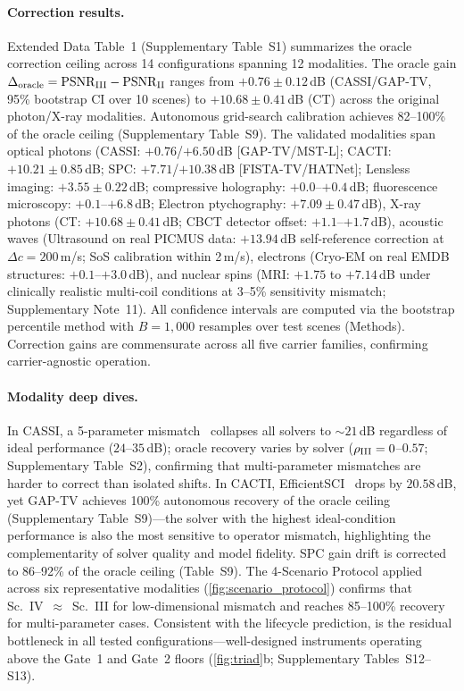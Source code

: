 \paragraph{Correction results.}
Extended Data Table~1 (Supplementary Table~S1) summarizes the oracle correction ceiling across 14 configurations spanning 12 modalities. The oracle gain $\Delta_{\mathrm{oracle}} = \mathrm{PSNR}_{\mathrm{III}} - \mathrm{PSNR}_{\mathrm{II}}$ ranges from $+0.76 \pm 0.12$\,dB (CASSI/GAP-TV, 95\% bootstrap CI over 10 scenes) to $+10.68 \pm 0.41$\,dB (CT) across the original photon/X-ray modalities. Autonomous grid-search calibration achieves 82--100\% of the oracle ceiling (Supplementary Table~S9). The validated modalities span optical photons (CASSI: $+0.76$/$+6.50$\,dB [GAP-TV/MST-L]; CACTI: $+10.21 \pm 0.85$\,dB; SPC: $+7.71$/$+10.38$\,dB [FISTA-TV/HATNet]; Lensless imaging: $+3.55 \pm 0.22$\,dB; compressive holography: $+0.0$--$+0.4$\,dB; fluorescence microscopy: $+0.1$--$+6.8$\,dB; Electron ptychography: $+7.09 \pm 0.47$\,dB), X-ray photons (CT: $+10.68 \pm 0.41$\,dB; CBCT detector offset: $+1.1$--$+1.7$\,dB), acoustic waves (Ultrasound on real PICMUS data: $+13.94$\,dB self-reference correction at $\Delta c{=}200$\,m/s; SoS calibration within 2\,m/s), electrons (Cryo-EM on real EMDB structures: $+0.1$--$+3.0$\,dB), and nuclear spins (MRI: $+1.75$ to $+7.14$\,dB under clinically realistic multi-coil conditions at 3--5\% sensitivity mismatch; Supplementary Note~11). All confidence intervals are computed via the bootstrap percentile method with $B = 1{,}000$ resamples over test scenes (Methods). Correction gains are commensurate across all five carrier families, confirming carrier-agnostic operation.

\paragraph{Modality deep dives.}
In CASSI, a 5-parameter mismatch~\cite{yang2026inversenet} collapses all solvers to ${\sim}21$\,dB regardless of ideal performance ($24$--$35$\,dB); oracle recovery varies by solver ($\rho_{\mathrm{III}} = 0$--$0.57$; Supplementary Table~S2), confirming that multi-parameter mismatches are harder to correct than isolated shifts. In CACTI, EfficientSCI~\cite{wang2023efficientsci} drops by $20.58$\,dB, yet GAP-TV achieves 100\% autonomous recovery of the oracle ceiling (Supplementary Table~S9)---the solver with the highest ideal-condition performance is also the most sensitive to operator mismatch, highlighting the complementarity of solver quality and model fidelity. SPC gain drift is corrected to 86--92\% of the oracle ceiling (Table~S9). The 4-Scenario Protocol applied across six representative modalities (\cref{fig:scenario_protocol}) confirms that Sc.~IV~$\approx$~Sc.~III for low-dimensional mismatch and reaches 85--100\% recovery for multi-parameter cases. Consistent with the lifecycle prediction, \gatethree{} is the residual bottleneck in all tested configurations---well-designed instruments operating above the Gate~1 and Gate~2 floors (\cref{fig:triad}b; Supplementary Tables~S12--S13).

